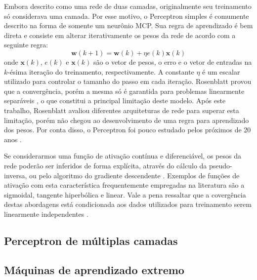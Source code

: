 \documentclass[conference]{IEEEtran}
\begin{document}
	Embora descrito como uma rede de duas camadas, originalmente seu treinamento só considerava uma camada. Por esse motivo, o Perceptron simples é comumente descrito na forma de somente um neurônio MCP. Sua regra de aprendizado é bem direta e consiste em alterar iterativamente os pesos da rede de acordo com a seguinte regra:
	\begin{equation}
		\mathbf{w}(k+1) = \mathbf{w}(k) + \eta e(k) \mathbf{x}(k)
	\end{equation}
	onde $\mathbf{x}(k)$, $e(k)$ e $\mathbf{x}(k)$ são o vetor de pesos, o erro e o vetor de entradas na $k$-ésima iteração do treinamento, respectivamente. A constante $\eta$ é um escalar utilizado para controlar o tamanho do passo em cada iteração. Rosenblatt provou que a convergência, porém a mesma só é garantida para problemas linearmente separáveis \cite{minsky1969introduction}, o que constitui a principal limitação deste modelo. Após este trabalho, Rosenblatt avaliou diferentes arquiteturas de rede para superar esta limitação, porém não chegou ao desenvolvimento de uma regra para aprendizado dos pesos. Por conta disso, o Perceptron foi pouco estudado pelos próximos de 20 anos \cite{hertz1991introduction}.
	
	Se considerarmos uma função de ativação contínua e diferenciável, os pesos da rede poderão ser inferidos de forma explícita, através do cálculo da pseudo-inversa, ou pelo algoritmo do gradiente descendente \cite{hertz1991introduction}. Exemplos de funções de ativação com esta característica frequentemente empregadas na literatura são a sigmoidal, tangente hiperbólica e linear. Vale a pena ressaltar que a covergência destas abordagens está condicionada aos dados utilizados para treinamento serem linearmente independentes \cite{hertz1991introduction}.
	
	  
	
	
	
	
	
	\subsection{Perceptron de múltiplas camadas}
	

	\subsection{Máquinas de aprendizado extremo}
\end{document}

